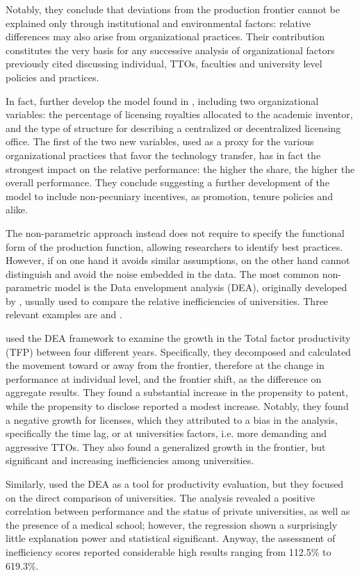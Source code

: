 Notably, they conclude that deviations from the production frontier cannot be explained only through institutional and environmental factors: relative differences may also arise from organizational practices. Their contribution constitutes the very basis for any successive analysis of organizational factors previously cited discussing individual, TTOs, faculties and university level policies and practices. 

In fact, \citet{Link2005} further develop the model found in \citet{Siegel2003a}, including two organizational variables: the percentage of licensing royalties allocated to the academic inventor, and the type of structure for describing a centralized or decentralized licensing office. The first of the two new variables, used as a proxy for the various organizational practices that favor the technology transfer, has in fact the strongest impact on the relative performance: the higher the share, the higher the overall performance. They conclude suggesting a further development of the model to include non-pecuniary incentives, as promotion, tenure policies and alike. 

The non-parametric approach instead does not require to specify the functional form of the production function, allowing researchers to identify best practices. However, if on one hand it avoids similar assumptions, on the other hand cannot distinguish and avoid the noise embedded in the data. The most common non-parametric model is the Data envelopment analysis (DEA), originally developed by \citet{Fare1993}, usually used to compare the relative inefficiencies of universities. Three relevant examples are \citet{Thursby2002} and \citet{Anderson2007}.

\citet{Thursby2002} used the DEA framework to examine the growth in the Total factor productivity (TFP) between four different years. Specifically, they decomposed and calculated the movement toward or away from the frontier, therefore at the change in performance at individual level, and the frontier shift, as the difference on aggregate results. They found a substantial increase in the propensity to patent, while the propensity to disclose reported a modest increase. Notably, they found a negative growth for licenses, which they attributed to a bias in the analysis, specifically the time lag, or at universities factors, i.e. more demanding and aggressive TTOs. They also found a generalized growth in the frontier, but significant and increasing inefficiencies among universities.

Similarly, \citet{Anderson2007} used the DEA as a tool for productivity evaluation, but they focused on the direct comparison of universities. The analysis revealed a positive correlation between performance and the status of private universities, as well as the presence of a medical school; however, the regression shown a surprisingly little explanation power and statistical significant. Anyway, the assessment of inefficiency scores reported considerable high results ranging from 112.5\% to 619.3\%.

